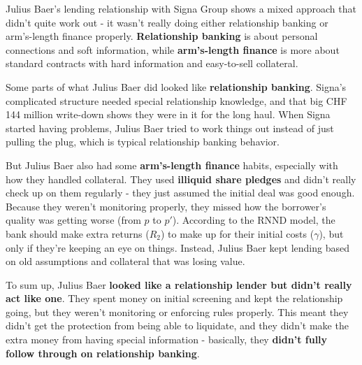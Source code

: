 Julius Baer's lending relationship with Signa Group shows a mixed approach that didn't quite work out - it wasn't really doing either relationship banking or arm's-length finance properly. \textbf{Relationship banking} is about personal connections and soft information, while \textbf{arm's-length finance} is more about standard contracts with hard information and easy-to-sell collateral.

Some parts of what Julius Baer did looked like \textbf{relationship banking}. Signa's complicated structure needed special relationship knowledge, and that big CHF 144 million write-down shows they were in it for the long haul. When Signa started having problems, Julius Baer tried to work things out instead of just pulling the plug, which is typical relationship banking behavior.

But Julius Baer also had some \textbf{arm's-length finance} habits, especially with how they handled collateral. They used \textbf{illiquid share pledges} and didn't really check up on them regularly - they just assumed the initial deal was good enough. Because they weren't monitoring properly, they missed how the borrower's quality was getting worse (from $p$ to $p'$). According to the RNND model, the bank should make extra returns ($R_2$) to make up for their initial costs ($\gamma$), but only if they're keeping an eye on things. Instead, Julius Baer kept lending based on old assumptions and collateral that was losing value.

To sum up, Julius Baer \textbf{looked like a relationship lender but didn't really act like one}. They spent money on initial screening and kept the relationship going, but they weren't monitoring or enforcing rules properly. This meant they didn't get the protection from being able to liquidate, and they didn't make the extra money from having special information - basically, they \textbf{didn't fully follow through on relationship banking}.
